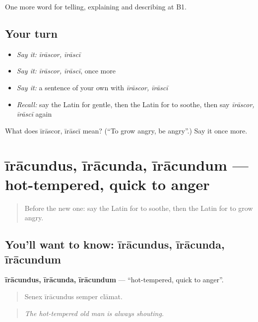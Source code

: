 \begin{grammarlens}[title={What you've built}]
One more word for telling, explaining and describing at B1.
\end{grammarlens}

\subsection*{Your turn}
\begin{itemize}
\raggedright
  \item \emph{Say it:} \emph{īrāscor, īrāscī}
  \item \emph{Say it:} \emph{īrāscor, īrāscī}, once more
  \item \emph{Say it:} a sentence of your own with \emph{īrāscor, īrāscī}
  \item \emph{Recall:} say the Latin for gentle, then the Latin for to soothe, then say \emph{īrāscor, īrāscī} again
\end{itemize}

\begin{tcolorbox}[breakable,colback=teal!4,colframe=teal!35!black,title={Before you move on}]
What does īrāscor, īrāscī mean? (\textquotedblleft{}To grow angry, be angry\textquotedblright{}.) Say it once more.
\end{tcolorbox}
\section[īrācundus, īrācunda, īrācundum]{īrācundus, īrācunda, īrācundum — hot-tempered, quick to anger}

\label{lesson:LA-C493-iracundus}



\begin{quote}
Before the new one: say the Latin for to soothe, then the Latin for to grow angry.
\end{quote}

\subsection*{You'll want to know: īrācundus, īrācunda, īrācundum}
\textbf{īrācundus, īrācunda, īrācundum} — \textquotedblleft{}hot-tempered, quick to anger\textquotedblright{}.

\begin{quote}
Senex īrācundus semper clāmat.
\end{quote}

\begin{quote}
\emph{The hot-tempered old man is always shouting.}
\end{quote}

